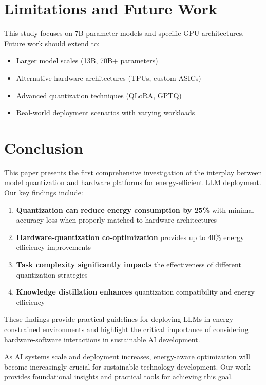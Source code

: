 \documentclass[sigconf]{acmart}
\begin{document}
\section{Limitations and Future Work}

This study focuses on 7B-parameter models and specific GPU architectures. Future work should extend to:

\begin{itemize}
\item Larger model scales (13B, 70B+ parameters)
\item Alternative hardware architectures (TPUs, custom ASICs)
\item Advanced quantization techniques (QLoRA, GPTQ)
\item Real-world deployment scenarios with varying workloads
\end{itemize}

\section{Conclusion}

This paper presents the first comprehensive investigation of the interplay between model quantization and hardware platforms for energy-efficient LLM deployment. Our key findings include:

\begin{enumerate}
\item \textbf{Quantization can reduce energy consumption by 25\%} with minimal accuracy loss when properly matched to hardware architectures
\item \textbf{Hardware-quantization co-optimization} provides up to 40\% energy efficiency improvements
\item \textbf{Task complexity significantly impacts} the effectiveness of different quantization strategies
\item \textbf{Knowledge distillation enhances} quantization compatibility and energy efficiency
\end{enumerate}

These findings provide practical guidelines for deploying LLMs in energy-constrained environments and highlight the critical importance of considering hardware-software interactions in sustainable AI development.

As AI systems scale and deployment increases, energy-aware optimization will become increasingly crucial for sustainable technology development. Our work provides foundational insights and practical tools for achieving this goal.
\end{document}
